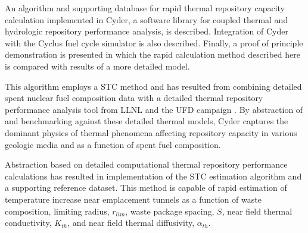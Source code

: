 
An algorithm and supporting database for rapid thermal repository capacity 
calculation implemented in Cyder, a software library for coupled thermal and 
hydrologic repository performance analysis, is described. Integration of Cyder 
with the Cyclus fuel cycle simulator is also described. Finally, a proof of 
principle demonstration is presented in which the rapid calculation method 
described here is compared with results of a more detailed model.

This algorithm employs a \gls{STC} method 
\cite{radel_effect_2007, radel_repository_2007} and has 
resulted from combining detailed spent nuclear fuel composition data 
\cite{carter_fuel_2011} with a
detailed thermal repository performance analysis tool from 
\gls{LLNL} and the \gls{UFD} campaign \cite{greenberg_application_2012}. By 
abstraction of and benchmarking against these detailed thermal models, Cyder 
captures the dominant 
physics of thermal phenomena affecting repository capacity in various geologic 
media and as a function of spent fuel composition.

Abstraction based on detailed computational thermal repository performance 
calculations has resulted in implementation of the \gls{STC} estimation 
algorithm and a supporting reference dataset.  This method is capable of 
rapid estimation of temperature increase near emplacement tunnels as a function 
of waste composition, limiting radius, $r_{lim}$, waste package spacing, $S$, 
near 
field thermal conductivity, $K_{th}$, and near field thermal diffusivity, 
$\alpha_{th}$.
